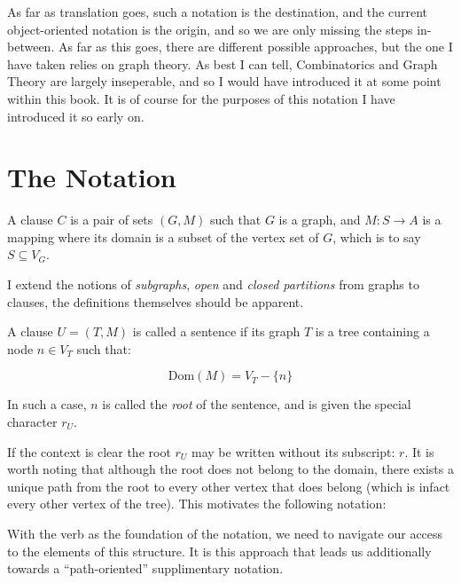 \documentclass[twoside]{book}
\newenvironment{definition}[1][Definition]{\begin{trivlist}
\item[\hskip \labelsep {\bfseries Definition (#1):}]}{\end{trivlist}}
\begin{document}
As far as translation goes, such a notation is the destination, and the current object-oriented notation is
the origin, and so we are only missing the steps in-between.  As far as this goes, there are different
possible approaches, but the one I have taken relies on graph theory.  As best I can tell, Combinatorics
and Graph Theory are largely inseperable, and so I would have introduced it at some point within this book.
It is of course for the purposes of this notation I have introduced it so early on.

\section{The Notation}

\begin{definition}[Clause]

A clause $ C $ is a pair of sets $ (G, M) $ such that $ G $ is a graph, and $ M:S\to A $ is a mapping where its domain
is a subset of the vertex set of $ G $, which is to say $ S\subseteq V_G $.

\end{definition}
I extend the notions of \emph{subgraphs}, \emph{open} and \emph{closed partitions} from graphs to clauses,
the definitions themselves should be apparent.

\begin{definition}[Sentence]

A clause $ U=(T, M) $ is called a sentence if its graph $ T $ is a tree containing a node $ n\in V_T $ such that:

$$ \mbox{Dom}(M)=V_T-\{n\} $$

In such a case, $ n $ is called the \emph{root} of the sentence, and is given the special character $ r_U $.

\end{definition}
If the context is clear the root $ r_U $ may be written without its subscript: $ r $.
It is worth noting that although the root does not belong to the domain, there exists
a unique path from the root to every other vertex that does belong (which is infact
every other vertex of the tree).  This motivates the following notation:

With the verb as the foundation of the notation, we need to navigate our access to the elements of this structure.
It is this approach that leads us additionally towards a ``path-oriented'' supplimentary notation.
\end{document}
